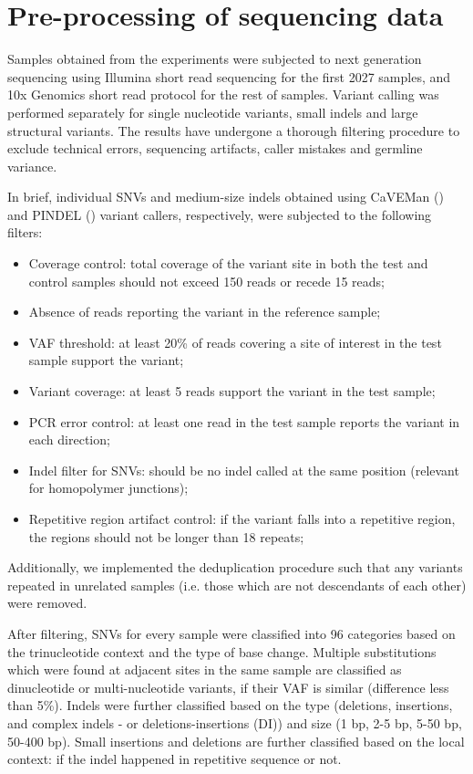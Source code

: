 
\pagestyle{empty}

\appendix
\chapter*{Pre-processing of sequencing data}

Samples obtained from the experiments were subjected to next generation sequencing 
using Illumina short read sequencing for the first 2027 samples, and 10x Genomics 
short read protocol for the rest of samples. Variant calling was performed separately 
for single nucleotide variants, small indels  and large structural variants. The results 
have undergone a thorough filtering procedure to exclude technical errors, sequencing artifacts, 
caller mistakes and germline variance.

In brief, individual SNVs and medium-size indels obtained using CaVEMan (\cite{caveman}) and PINDEL (\cite{pindel}) variant callers, respectively, were subjected to the following filters:
\begin{itemize}
\itemsep0em
\item Coverage control: total coverage of the variant site in both the test and control samples should not exceed 150 reads or recede 15 reads;
\item Absence of reads reporting the variant in the reference sample;
\item VAF threshold: at least 20\% of reads covering a site of interest in the test sample support the variant;
\item Variant coverage: at least 5 reads support the variant in the test sample;
\item PCR error control: at least one read in the test sample reports the variant in each direction;
\item Indel filter for SNVs: should be no indel called at the same position (relevant for homopolymer junctions);
\item Repetitive region artifact control: if the variant falls into a repetitive region, the regions should not be longer than 18 repeats;
\end{itemize}

Additionally, we implemented the deduplication procedure such that any variants repeated in unrelated samples (i.e. those which are not descendants of each other) were removed. 

After filtering, SNVs for every sample were classified into 96 categories based on the trinucleotide
context and the type of base change. Multiple substitutions which were found at adjacent sites in 
the same sample are classified as dinucleotide or multi-nucleotide variants, if their VAF is similar
(difference less than 5\%). Indels were further classified based on the type (deletions, 
insertions, and complex indels - or
deletions-insertions (DI)) and size (1 bp, 2-5 bp, 5-50 bp, 50-400 bp). Small insertions and deletions
are further classified based on the local context: if the indel happened in repetitive sequence or not.

